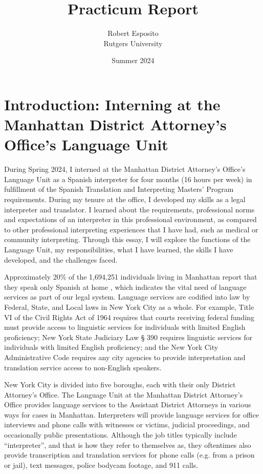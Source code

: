 \documentclass{article}
\title{Practicum Report}
\author{Robert Esposito \\ Rutgers University}
\date{Summer 2024}
\begin{document}
\maketitle

\newpage

\tableofcontents

\newpage

\listoffigures

\newpage

\listoftables

\newpage

\doublespacing

\section{Introduction: Interning at the Manhattan District Attorney's Office's Language Unit}

During Spring 2024, I interned at the Manhattan District Attorney’s Office’s Language Unit as a Spanish interpreter for four months (16 hours per week) in fulfillment of the Spanish Translation and Interpreting Masters’ Program requirements. During my tenure at the office, I developed my skills as a legal interpreter and translator. I learned about the requirements, professional norms and expectations of an interpreter in this professional environment, as compared to other professional interpreting experiences that I have had, such as medical or community interpreting. Through this essay, I will explore the functions of the Language Unit, my responsibilities, what I have learned, the skills I have developed, and the challenges faced.

Approximately 20\% of the 1,694,251 individuals living in Manhattan report that they speak only Spanish at home \citep{us_census_bureau2023}, which indicates the vital need of language services as part of our legal system. Language services are codified into law by Federal, State, and Local laws in New York City as a whole. For example, Title VI of the Civil Rights Act of 1964 requires that courts receiving federal funding must provide access to linguistic services for individuals with limited English proficiency; New York State Judiciary Law § 390 requires linguistic services for individuals with limited English proficiency; and the New York City Administrative Code requires any city agencies to provide interpretation and translation service access to non-English speakers.

New York City is divided into five boroughs, each with their only District Attorney’s Office. The Language Unit at the Manhattan District Attorney’s Office provides language services to the Assistant District Attorneys in various ways for cases in Manhattan. Interpreters will provide language services for office interviews and phone calls with witnesses or victims, judicial proceedings, and occasionally public presentations. Although the job titles typically include “interpreter”, and that is how they refer to themselves as, they oftentimes also provide transcription and translation services for phone calls (e.g. from a prison or jail), text messages, police bodycam footage, and 911 calls.
\end{document}
